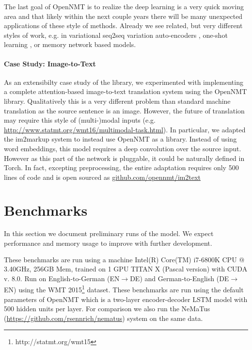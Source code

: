 \documentclass[11pt]{article}
\begin{document}
The last goal of OpenNMT is to realize the deep learning is a very
quick moving area and that likely within the next couple years there
will be many unexpected applications of these style of
methods. Already we see related, but very different styles of work,
e.g.  in variational seq2seq variation auto-encoders
\cite{DBLP:conf/conll/BowmanVVDJB16}, one-shot learning
\cite{DBLP:conf/nips/VinyalsBLKW16}, or memory network \cite{DBLP:journals/corr/WestonCB14} based models.


\paragraph{Case Study: Image-to-Text}

As an extensibilty case study of the library, we experimented with
implementing a complete attention-based image-to-text translation
system \cite{DBLP:journals/corr/XuBKCCSZB15} using the OpenNMT
library. Qualitatively this is a very different problem than standard
machine translation as the source sentence is an image.  However, the
future of translation may require this style of (multi-)modal inputs
(e.g. \url{http://www.statmt.org/wmt16/multimodal-task.html}). In
particular, we adapted the im2markup system
\cite{DBLP:journals/corr/DengKR16} to instead use OpenNMT as a
library.  Instead of using word embeddings, this model requires a deep
convolution over the source input. However as this part of the network
is pluggable, it could be naturally defined in Torch. In fact,
excepting preprocessing, the entire adaptation requires only 500 lines
of code and is open sourced as \url{github.com/opennmt/im2text}

\section{Benchmarks}


In this section we document preliminary runs of the model. We expect
performance and memory usage to improve with further development.

These benchmarks are run using a machine Intel(R) Core(TM) i7-6800K CPU @
3.40GHz, 256GB Mem, trained on 1 GPU TITAN X (Pascal version) with
CUDA v. 8.0.  Run on English-to-German (EN$\rightarrow$DE) and
German-to-English (DE$\rightarrow$EN) using the WMT 2015\footnote{http://statmt.org/wmt15}
dataset. These benchmarks are run using the default parameters of
OpenNMT which is a two-layer encoder-decoder LSTM model with 500
hidden units per layer. For comparison we also run the NeMaTus (\url{https://github.com/rsennrich/nematus}) system on 
the same data.
\end{document}
